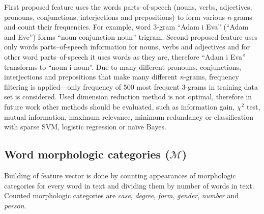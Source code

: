 \documentclass[11pt,english]{article}
\begin{document}
\begin{multicols}{2}
First proposed feature uses the words parts--of-speech
(nouns, verbs, adjectives, pronouns, conjunctions, interjections and
prepositions) to form various \emph{n}-grams and count their frequencies. For
example, word 3-gram ``Adam i Eva'' (``Adam and Eve'') forms ``noun
conjunction noun'' trigram. Second proposed feature uses only words
parts--of-speech information for nouns, verbs and adjectives and for other word
parts--of-speech it uses words as they are, therefore ``Adam i Eva'' transforms
to ``noun i noun''. Due to many different pronouns, conjunctions, interjections
and prepositions that make many different \emph{n}-grams, frequency filtering
is applied---only frequency of 500 most frequent 3-grams in
training data set is considered. Used dimension reduction method is not optimal,
therefore in future work other methods should be evaluated, such as information
gain, $\chi^2$ test, mutual information, maximum relevance, minimum redundancy
or classification with sparse SVM, logistic regression or na\"ive Bayes.

\subsection{Word morphologic categories ($\mathcal{M}$)}
\label{sec:morphosyntactic}
Building of feature vector is done by counting appearances of morphologic
categories for every word in text and dividing them by number of words in text.
Counted morphologic categories are \emph{case}, \emph{degree}, \emph{form},
\emph{gender}, \emph{number} and \emph{person}.

\end{multicols}
\end{document}
